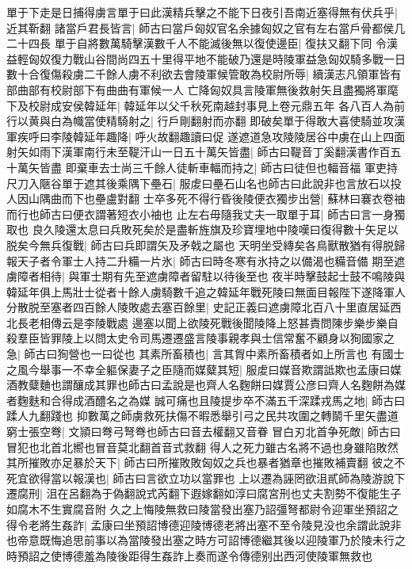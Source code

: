 單于下走是日捕得虜言單于曰此漢精兵擊之不能下日夜引吾南近塞得無有伏兵乎|{
	近其靳翻}
諸當戶君長皆言|{
	師古曰當戶匈奴官名余據匈奴之官有左右當戶骨都侯几二十四長}
單于自將數萬騎擊漢數千人不能滅後無以復使邊臣|{
	復扶又翻下同}
令漢益輕匈奴復力戰山谷間尚四五十里得平地不能破乃還是時陵軍益急匈奴騎多戰一日數十合復傷殺虜二千餘人虜不利欲去會陵軍候管敢為校尉所辱|{
	續漢志凡領軍皆有部曲部有校尉部下有曲曲有軍候一人}
亡降匈奴具言陵軍無後救射矢且盡獨將軍麾下及校尉成安侯韓延年|{
	韓延年以父千秋死南越封事見上卷元鼎五年}
各八百人為前行以黄與白為幟當使精騎射之|{
	行戶剛翻射而亦翻}
即破矣單于得敢大喜使騎並攻漢軍疾呼曰李陵韓延年趣降|{
	呼火故翻趣讀曰促}
遂遮道急攻陵陵居谷中虜在山上四面射矢如雨下漢軍南行未至鞮汗山一日五十萬矢皆盡|{
	師古曰鞮音丁奚翻漢書作百五十萬矢皆盡}
即棄車去士尚三千餘人徒斬車輻而持之|{
	師古曰徒但也輻音福}
軍吏持尺刀入陿谷單于遮其後乘隅下壘石|{
	服䖍曰壘石山名也師古曰此說非也言放石以投人因山隅曲而下也壘盧對翻}
士卒多死不得行昏後陵便衣獨步出營|{
	蘇林曰褰衣卷䄂而行也師古曰便衣謂著短衣小䄂也}
止左右毋隨我丈夫一取單于耳|{
	師古曰言一身獨取也}
良久陵還太息曰兵敗死矣於是盡斬旌旗及珍寶埋地中陵嘆曰復得數十矢足以脱矣今無兵復戰|{
	師古曰兵即謂矢及矛戟之屬也}
天明坐受縳矣各鳥獸散猶有得脱歸報天子者令軍士人持二升糒一片氷|{
	師古曰時冬寒有氷持之以備渴也糒音備}
期至遮虜障者相待|{
	與軍士期有先至遮虜障者留駐以待後至也}
夜半時擊鼓起士鼓不鳴陵與韓延年俱上馬壯士從者十餘人虜騎數千追之韓延年戰死陵曰無面目報陛下遂降軍人分散脱至塞者四百餘人陵敗處去塞百餘里|{
	史記正義曰遮虜障北百八十里直居延西北長老相傳云是李陵戰處}
邊塞以聞上欲陵死戰後聞陵降上怒甚責問陳步樂步樂自殺羣臣皆罪陵上以問太史令司馬遷遷盛言陵事親孝與士信常奮不顧身以狥國家之急|{
	師古曰狥營也一曰從也}
其素所畜積也|{
	言其胷中素所畜積者如上所言也}
有國士之風今舉事一不幸全軀保妻子之臣隨而媒糵其短|{
	服䖍曰媒音欺謂詆欺也孟康曰媒酒教糵麯也謂釀成其罪也師古曰孟說是也齊人名麴餅曰媒賈公彦曰齊人名麴餅為媒者麴麩和合得成酒醴名之為媒}
誠可痛也且陵提步卒不滿五千深蹂戎馬之地|{
	師古曰蹂人九翻踐也}
抑數萬之師虜救死扶傷不暇悉舉引弓之民共攻圍之轉鬬千里矢盡道窮士張空弮|{
	文頴曰弮弓弩弮也師古曰音去權翻又音眷}
冒白刃北首争死敵|{
	師古曰冒犯也北首北嚮也冒音莫北翻首音式救翻}
得人之死力雖古名將不過也身雖陷敗然其所摧敗亦足暴於天下|{
	師古曰所摧敗敗匈奴之兵也暴者猶章也摧敗補賣翻}
彼之不死宜欲得當以報漢也|{
	師古曰言欲立功以當罪也}
上以遷為誣罔欲沮貳師為陵游說下遷腐刑|{
	沮在呂翻為于偽翻說式芮翻下遐嫁翻如淳曰腐宮刑也丈夫割勢不復能生子如腐木不生實腐音附}
久之上悔陵無救曰陵當發出塞乃詔彊弩都尉令迎軍坐預詔之得令老將生姦詐|{
	孟康曰坐預詔博德迎陵博德老將出塞不至令陵見没也余謂此說非也帝意既悔追思前事以為當陵發出塞之時方可詔博德繼其後以迎陵軍乃於陵未行之時預詔之使博德羞為陵後距得生姦詐上奏而遂令傳德别出西河使陵軍無救也}
